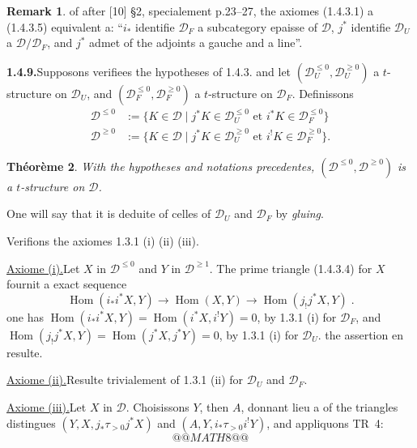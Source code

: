 \documentclass[12pt,a4paper]{article}
\theoremstyle{plain}
\newtheorem{theorem}{Th\'eor\`eme}[section]
\theoremstyle{definition}
\newtheorem{remark}[theorem]{Remark}
\DeclareMathOperator{\Hom}{Hom}
\begin{document}
\begin{remark}\label{rem:1.4.8}
of after [10] \S 2, specialement p.23--27, the axiomes (1.4.3.1) a (1.4.3.5) equivalent a: ``$i_*$ identifie $\mathcal{D}_F$ a subcategory epaisse of $\mathcal{D}$, $j^*$ identifie $\mathcal{D}_U$ a $\mathcal{D}/\mathcal{D}_F$, and $j^*$ admet of the adjoints a gauche and a line''.
\end{remark}

\smallskip
\noindent\textbf{1.4.9.}\quad Supposons verifiees the hypotheses of 1.4.3. and let $(\mathcal{D}_U^{\leqslant 0}, \mathcal{D}_U^{\geqslant 0})$ a $t$-structure on $\mathcal{D}_U$, and $(\mathcal{D}_F^{\leqslant 0}, \mathcal{D}_F^{\geqslant 0})$ a $t$-structure on $\mathcal{D}_F$. Definissons
\begin{align*}
\mathcal{D}^{\leqslant 0} &:= \{K \in \mathcal{D} \mid j^*K \in \mathcal{D}_U^{\leqslant 0} \text{ et } i^*K \in \mathcal{D}_F^{\leqslant 0}\}\\
\mathcal{D}^{\geqslant 0} &:= \{K \in \mathcal{D} \mid j^*K \in \mathcal{D}_U^{\geqslant 0} \text{ et } i^!K \in \mathcal{D}_F^{\geqslant 0}\}.
\end{align*}

\begin{theorem}\label{thm:1.4.10}
With the hypotheses and notations precedentes, $(\mathcal{D}^{\leqslant 0}, \mathcal{D}^{\geqslant 0})$ is a $t$-structure on $\mathcal{D}$.
\end{theorem}

One will say that it is deduite of celles of $\mathcal{D}_U$ and $\mathcal{D}_F$ by \emph{gluing}.

Verifions the axiomes 1.3.1 (i) (ii) (iii).

\smallskip
\noindent\underline{Axiome (i).}\quad Let $X$ in $\mathcal{D}^{\leqslant 0}$ and $Y$ in $\mathcal{D}^{\geqslant 1}$. The prime triangle (1.4.3.4) for $X$ fournit a exact sequence
\[
\Hom(i_*i^*X, Y) \to \Hom(X,Y) \to \Hom(j_!j^*X, Y)\;.
\]
one has $\Hom(i_*i^*X, Y) = \Hom(i^*X, i^!Y) = 0$, by 1.3.1 (i) for $\mathcal{D}_F$, and $\Hom(j_!j^*X, Y) = \Hom(j^*X, j^*Y) = 0$, by 1.3.1 (i) for $\mathcal{D}_U$. the assertion en resulte.

\smallskip
\noindent\underline{Axiome (ii).}\quad Resulte trivialement of 1.3.1 (ii) for $\mathcal{D}_U$ and $\mathcal{D}_F$.

\smallskip
\noindent\underline{Axiome (iii).}\quad Let $X$ in $\mathcal{D}$. Choisissons $Y$, then $A$, donnant lieu a of the triangles distingues $(Y, X, j_*\tau_{>0}j^*X)$ and $(A, Y, i_*\tau_{>0}i^!Y)$, and appliquons TR~4:
\[
@@MATH8@@
\]
\end{document}
